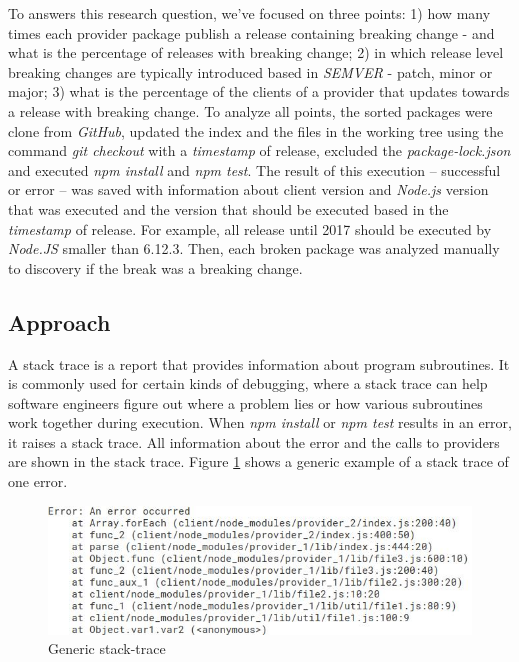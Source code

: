 To answers this research question, we've focused on three points: 1) how many times each provider package publish a release containing breaking change - and what is the percentage of releases with breaking change; 2) in which release level breaking changes are typically introduced based in \textit{SEMVER} - patch, minor or major; 3) what is the percentage of the clients of a provider that updates towards a release with breaking change. To analyze all points, the sorted packages were clone from \textit{GitHub}, updated the index and the files in the working tree using the command \textit{git checkout} with a \textit{timestamp} of release, excluded the \textit{package-lock.json} and executed \textit{npm install} and \textit{npm test}. The result of this execution -- successful or error -- was saved with information about client version and \textit{Node.js} version that was executed and the version that should be executed based in the \textit{timestamp} of release. For example, all release until 2017 should be executed by \textit{Node.JS} smaller than 6.12.3. Then, each broken package was analyzed manually to discovery if the break was a breaking change.

\subsection{Approach}
\label{apr:rq1}

A stack trace is a report that provides information about program subroutines. It is commonly used for certain kinds of debugging, where a stack trace can help software engineers figure out where a problem lies or how various subroutines work together during execution. When \textit{npm install} or \textit{npm test} results in an error, it raises a stack trace. All information about the error and the calls to providers are shown in the stack trace. Figure \ref{fig:trace} shows a generic example of a stack trace of one error.

\begin{figure}
    \centering
    \includegraphics[scale=0.7]{figuras/stack_trace.jpeg}
    \caption{Generic stack-trace}
    \label{fig:trace}
\end{figure}{}

